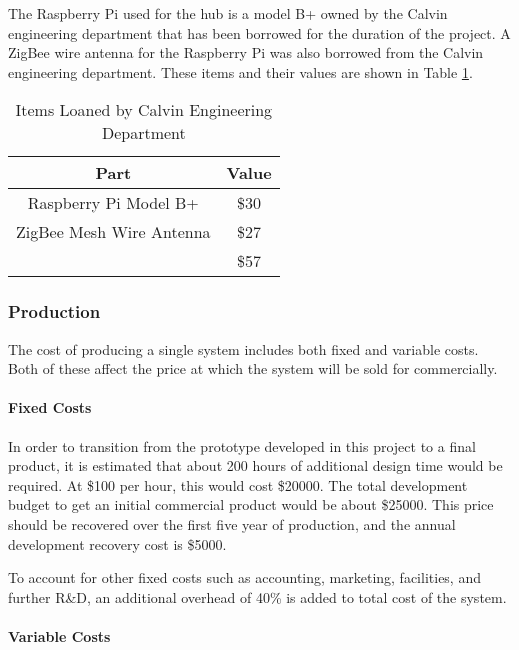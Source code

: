 \documentclass[PPFS.tex]{template/subfiles}
\begin{document}
        The Raspberry Pi used for the hub is a model B+ owned by the Calvin engineering department that has been borrowed for the duration of the project. A ZigBee wire antenna for the Raspberry Pi was also borrowed from the Calvin engineering department. These items and their values are shown in Table \ref{tab:devLoanedItems}.
        
        \begin{table}[H]
        	\begin{center}
        		\caption{Items Loaned by Calvin Engineering Department}
        		\label{tab:devLoanedItems}
        		\begin{tabular}{|c|c|}
        			\hline
        			Part & Value\\
        			\hline
        			Raspberry Pi Model B+ & \$30 \\
        			\hline
        			ZigBee Mesh Wire Antenna & \$27 \\
        			\hline
        			& \$57\\
        			\hline
        		\end{tabular}
        	\end{center}
        \end{table}
        \subsubsection{Production}
        The cost of producing a single system includes both fixed and variable costs. Both of these affect the price at which the system will be sold for commercially.
        
        \paragraph{Fixed Costs}	
        In order to transition from the prototype developed in this project to a final product, it is estimated that about 200 hours of additional design time would be required. At \$100 per hour, this would cost \$20000. The total development budget to get an initial commercial product would be about \$25000. This price should be recovered over the first five year of production, and the annual development recovery cost is \$5000.
        
        To account for other fixed costs such as accounting, marketing, facilities, and further R\&D, an additional overhead of 40\% is added to total cost of the system.
        
        \paragraph{Variable Costs}
        
\end{document}
